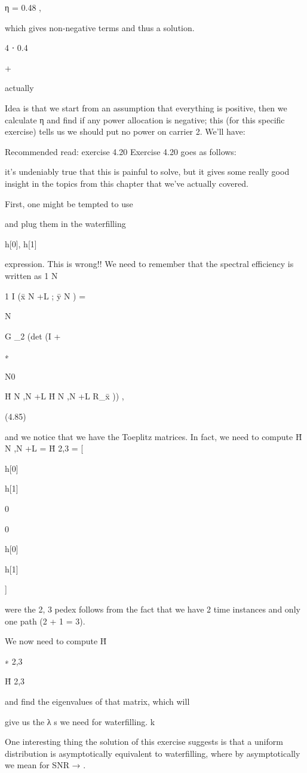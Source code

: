 {{{{{η = 0.48 ,

which gives non-negative terms and thus a solution.

4 ⋅ 0.4

+

actually

Idea is that we start from an assumption that everything is positive, then we calculate η and find if any power allocation is negative; this (for this specific exercise) tells us we should put no power on carrier 2.
We'll have:

Recommended read: exercise 4.20 Exercise 4.20 goes as follows:

it's undeniably true that this is painful to solve, but it gives some really good insight in the topics from this chapter that we've actually covered.

First, one might be tempted to use

and plug them in the waterfilling

h[0], h[1]

expression. This is wrong!! We need to remember that the spectral efficiency is written as 1 N

1 I (x̄ N +L ; ȳ N ) =

N

G
\log_2 (det (I +

∗

N0

H̄ N ,N +L H̄ N ,N +L R_x̄ )) ,

(4.85)

and we notice that we have the Toeplitz matrices. In fact, we need to compute H̄ N ,N +L = H̄ 2,3 = [

h[0]

h[1]

0

0

h[0]

h[1]

]

were the 2, 3 pedex follows from the fact that we have 2 time instances and only one path (2 + 1 = 3).

We now need to compute H̄

∗
2,3

H̄ 2,3

and find the eigenvalues of that matrix, which will

give us the λ s we need for waterfilling.
k

One interesting thing the solution of this exercise suggests is that a uniform distribution is asymptotically equivalent to waterfilling, where by asymptotically we mean for SNR → \infty.

}}}}}
